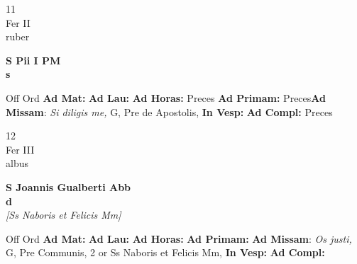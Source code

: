 \documentclass[10pt, openany]{book}
\begin{document}
        \begin{center}
            \begin{minipage}{3.5in}
                \vspace{2em}
                \begin{minipage}{0.5in}
                    {\Huge 11} \\
                    {\normalsize Fer II} \\
                    {\normalsize ruber}
                \end{minipage}
                \begin{minipage}{3.0in}
                    \textbf{ \large S Pii I PM \\
                    \textnormal{\normalsize s}} \\ 
                \end{minipage}
                \begin{justify}Off Ord
                    \textbf{Ad Mat: }
                    \textbf{Ad Lau: }
                    \textbf{Ad Horas: }Preces
                    \textbf{Ad Primam: }Preces\textbf{Ad Missam}: \textit{Si diligis me,} G, Pre de Apostolis,  
                    \textbf{In Vesp: }
                    \textbf{Ad Compl: }Preces
                \end{justify}
            \end{minipage}
        \end{center}
    
        \begin{center}
            \begin{minipage}{3.5in}
                \vspace{2em}
                \begin{minipage}{0.5in}
                    {\Huge 12} \\
                    {\normalsize Fer III} \\
                    {\normalsize albus}
                \end{minipage}
                \begin{minipage}{3.0in}
                    \textbf{ \large S Joannis Gualberti Abb \\
                    \textnormal{\normalsize d}} \\ \textit{[Ss Naboris et Felicis Mm]} \\ 
                \end{minipage}
                \begin{justify}Off Ord
                    \textbf{Ad Mat: }
                    \textbf{Ad Lau: }
                    \textbf{Ad Horas: }
                    \textbf{Ad Primam: }\textbf{Ad Missam}: \textit{Os justi,} G, Pre Communis, 2 or Ss Naboris et Felicis Mm,  
                    \textbf{In Vesp: }
                    \textbf{Ad Compl: }
                \end{justify}
            \end{minipage}
        \end{center}
    
\end{document}
